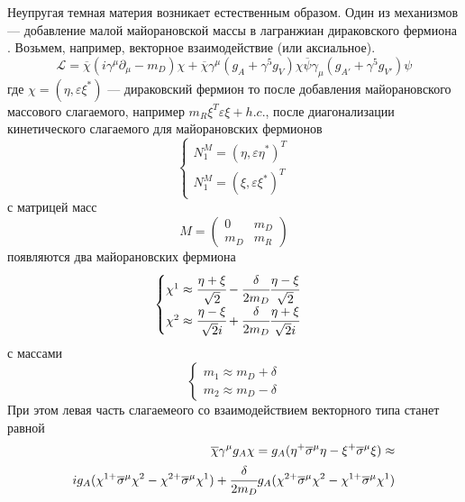 Неупругая темная материя возникает естественным образом. 
Один из механизмов --- добавление малой майорановской массы в лагранжиан дираковского фермиона \cite{PhysRevD.64.043502}.
Возьмем, например, векторное взаимодействие (или аксиальное).
\begin{equation}
	\label{eq:DM_L_naive_kinemat}
	\mathcal{L} = \overline{\chi}(i\gamma^{\mu}\partial_{\mu} - m_D)\chi +
	\overline{\chi}\gamma^{\mu}(g_A + \gamma^5 g_V) \chi \overline{\psi}\gamma_{\mu}(g_{A'} + \gamma^5 g_{V'})\psi
\end{equation}
где $\chi = (\eta,\varepsilon \xi^*)$ --- дираковский фермион
то после добавления майорановского массового слагаемого, например $m_R\xi^T\varepsilon \xi + h.c.$, после диагонализации кинетического слагаемого для майорановских фермионов
\begin{equation}
	\begin{cases}
		N_1^M = (\eta,\varepsilon\eta^*)^T\\
		N_1^M = (\xi,\varepsilon \xi^*)^T
	\end{cases}
\end{equation}
с матрицей масс
\begin{equation}
	M = 
	\begin{pmatrix}
		0 & m_D \\
		m_D & m_R
	\end{pmatrix}
\end{equation}
появляются два майорановских фермиона
\begin{equation}
	\begin{cases}
		\chi^1 \approx \cfrac{\eta + \xi}{\sqrt{2}} - \cfrac{\delta}{2m_D} \cfrac{\eta - \xi}{\sqrt{2} }\\
		\chi^2  \approx \cfrac{\eta - \xi}{\sqrt{2}i} + \cfrac{\delta}{2m_D} \cfrac{\eta + \xi}{\sqrt{2}i }\\
	\end{cases}
\end{equation}
с массами 
\begin{equation}
	\begin{cases}
		m_1 \approx m_D + \delta\\
		m_2 \approx m_D - \delta		
	\end{cases}
\end{equation}
При этом левая часть слагаемеого со взаимодействием векторного типа станет равной
\begin{equation}
	\begin{split}
	\overline{\chi}\gamma^{\mu}g_A \chi = 
	g_A(\eta^+ \overline{\sigma}^{\mu} \eta - \xi^+ \overline{\sigma}^{\mu} \xi) \approx \\ 
	i g_A (\chi^{1+} \overline{\sigma}^{\mu} \chi^2 - \chi^{2+} \overline{\sigma}^{\mu} \chi^1) + \cfrac{\delta}{2m_D}g_A 
	(
		\chi^{2+} \overline{\sigma}^{\mu}\chi^2 - 
		\chi^{1+}  \overline{\sigma}^{\mu}\chi^1
	)
	\end{split}
\end{equation}
